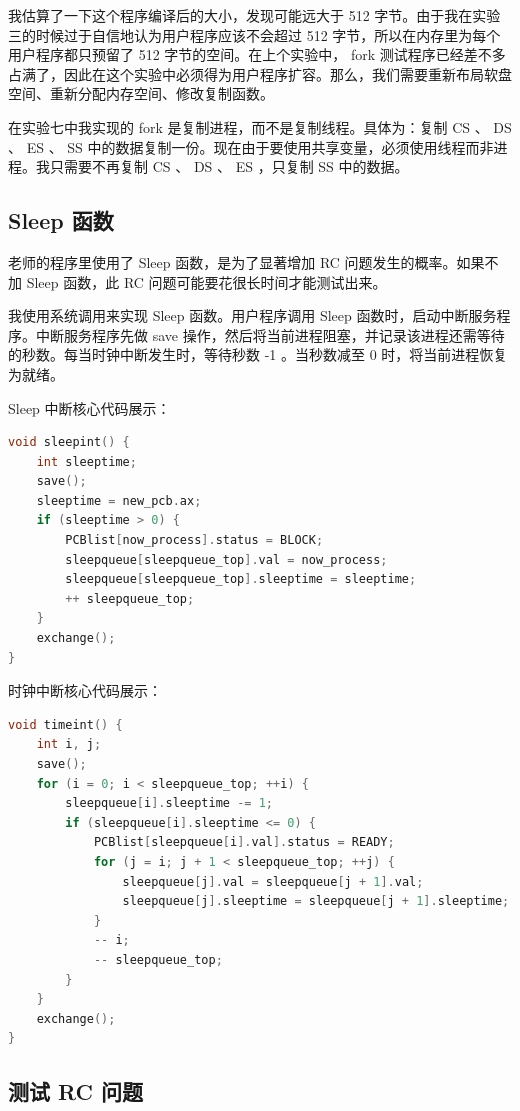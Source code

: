 \documentclass[a4paper]{article}
\begin{document}
我估算了一下这个程序编译后的大小，发现可能远大于 512 字节。由于我在实验三的时候过于自信地认为用户程序应该不会超过 512 字节，所以在内存里为每个用户程序都只预留了 512 字节的空间。在上个实验中， fork 测试程序已经差不多占满了，因此在这个实验中必须得为用户程序扩容。那么，我们需要重新布局软盘空间、重新分配内存空间、修改复制函数。

在实验七中我实现的 fork 是复制进程，而不是复制线程。具体为：复制 CS 、 DS 、 ES 、 SS 中的数据复制一份。现在由于要使用共享变量，必须使用线程而非进程。我只需要不再复制 CS 、 DS 、 ES ，只复制 SS 中的数据。

\subsection{Sleep 函数}

老师的程序里使用了 Sleep 函数，是为了显著增加 RC 问题发生的概率。如果不加 Sleep 函数，此 RC 问题可能要花很长时间才能测试出来。

我使用系统调用来实现 Sleep 函数。用户程序调用 Sleep 函数时，启动中断服务程序。中断服务程序先做 save 操作，然后将当前进程阻塞，并记录该进程还需等待的秒数。每当时钟中断发生时，等待秒数 -1 。当秒数减至 0 时，将当前进程恢复为就绪。

Sleep 中断核心代码展示：

\begin{lstlisting}[language=C]
void sleepint() {
	int sleeptime;
	save();
	sleeptime = new_pcb.ax;
	if (sleeptime > 0) {
		PCBlist[now_process].status = BLOCK;
		sleepqueue[sleepqueue_top].val = now_process;
		sleepqueue[sleepqueue_top].sleeptime = sleeptime;
		++ sleepqueue_top;
	}
	exchange();
}
\end{lstlisting}

时钟中断核心代码展示：

\begin{lstlisting}[language=C]
void timeint() {
	int i, j;
	save();
	for (i = 0; i < sleepqueue_top; ++i) {
		sleepqueue[i].sleeptime -= 1;
		if (sleepqueue[i].sleeptime <= 0) {
			PCBlist[sleepqueue[i].val].status = READY;
			for (j = i; j + 1 < sleepqueue_top; ++j) {
				sleepqueue[j].val = sleepqueue[j + 1].val;
				sleepqueue[j].sleeptime = sleepqueue[j + 1].sleeptime;
			}
			-- i;
			-- sleepqueue_top;
		}
	}
	exchange();
}
\end{lstlisting}

\subsection{测试 RC 问题}
\end{document}

